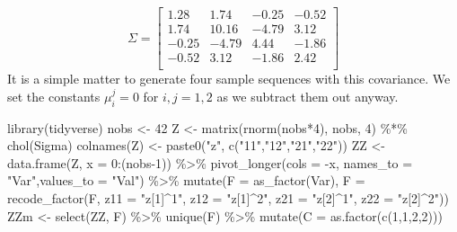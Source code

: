\documentclass[
  letterpaper,
]{book}
\newenvironment{Shaded}{\begin{snugshade}}{\end{snugshade}}
\newcommand{\AttributeTok}[1]{\textcolor[rgb]{0.40,0.45,0.13}{#1}}
\newcommand{\DecValTok}[1]{\textcolor[rgb]{0.68,0.00,0.00}{#1}}
\newcommand{\FunctionTok}[1]{\textcolor[rgb]{0.28,0.35,0.67}{#1}}
\newcommand{\NormalTok}[1]{\textcolor[rgb]{0.00,0.23,0.31}{#1}}
\newcommand{\OtherTok}[1]{\textcolor[rgb]{0.00,0.23,0.31}{#1}}
\newcommand{\SpecialCharTok}[1]{\textcolor[rgb]{0.37,0.37,0.37}{#1}}
\newcommand{\StringTok}[1]{\textcolor[rgb]{0.13,0.47,0.30}{#1}}
\begin{document}
\[
 \Sigma = \left[\begin{array}{r}1.28 &1.74 &-0.25 &-0.52 \\1.74 &10.16 &-4.79 &3.12 \\-0.25 &-4.79 &4.44 &-1.86 \\-0.52 &3.12 &-1.86 &2.42 \\\end{array}\right]
\] It is a simple matter to generate four sample sequences with this
covariance. We set the constants \(\mu_i^j = 0\) for \(i,j = 1,2\) as we
subtract them out anyway.

\begin{Shaded}
\begin{Highlighting}[]
\FunctionTok{library}\NormalTok{(tidyverse)}
\NormalTok{nobs        }\OtherTok{\textless{}{-}} \DecValTok{42}
\NormalTok{Z           }\OtherTok{\textless{}{-}} \FunctionTok{matrix}\NormalTok{(}\FunctionTok{rnorm}\NormalTok{(nobs}\SpecialCharTok{*}\DecValTok{4}\NormalTok{), nobs, }\DecValTok{4}\NormalTok{) }\SpecialCharTok{\%*\%} \FunctionTok{chol}\NormalTok{(Sigma)}
\FunctionTok{colnames}\NormalTok{(Z) }\OtherTok{\textless{}{-}} \FunctionTok{paste0}\NormalTok{(}\StringTok{"z"}\NormalTok{, }\FunctionTok{c}\NormalTok{(}\StringTok{"11"}\NormalTok{,}\StringTok{"12"}\NormalTok{,}\StringTok{"21"}\NormalTok{,}\StringTok{"22"}\NormalTok{))}
\NormalTok{ZZ   }\OtherTok{\textless{}{-}} \FunctionTok{data.frame}\NormalTok{(Z, }\AttributeTok{x =} \DecValTok{0}\SpecialCharTok{:}\NormalTok{(nobs}\DecValTok{{-}1}\NormalTok{)) }\SpecialCharTok{\%\textgreater{}\%} 
  \FunctionTok{pivot\_longer}\NormalTok{(}\AttributeTok{cols =} \SpecialCharTok{{-}}\NormalTok{x, }\AttributeTok{names\_to =} \StringTok{"Var"}\NormalTok{,}\AttributeTok{values\_to =} \StringTok{"Val"}\NormalTok{) }\SpecialCharTok{\%\textgreater{}\%} 
  \FunctionTok{mutate}\NormalTok{(}\AttributeTok{F =} \FunctionTok{as\_factor}\NormalTok{(Var), }
         \AttributeTok{F =} \FunctionTok{recode\_factor}\NormalTok{(F, }
                           \AttributeTok{z11 =} \StringTok{"z[1]\^{}1"}\NormalTok{, }
                           \AttributeTok{z12 =} \StringTok{"z[1]\^{}2"}\NormalTok{, }
                           \AttributeTok{z21 =} \StringTok{"z[2]\^{}1"}\NormalTok{, }
                           \AttributeTok{z22 =} \StringTok{"z[2]\^{}2"}\NormalTok{))}
\NormalTok{ZZm   }\OtherTok{\textless{}{-}} \FunctionTok{select}\NormalTok{(ZZ, F) }\SpecialCharTok{\%\textgreater{}\%} 
  \FunctionTok{unique}\NormalTok{(F) }\SpecialCharTok{\%\textgreater{}\%} 
  \FunctionTok{mutate}\NormalTok{(}\AttributeTok{C =} \FunctionTok{as.factor}\NormalTok{(}\FunctionTok{c}\NormalTok{(}\DecValTok{1}\NormalTok{,}\DecValTok{1}\NormalTok{,}\DecValTok{2}\NormalTok{,}\DecValTok{2}\NormalTok{)))}


\end{Highlighting}
\end{Shaded}
\end{document}

